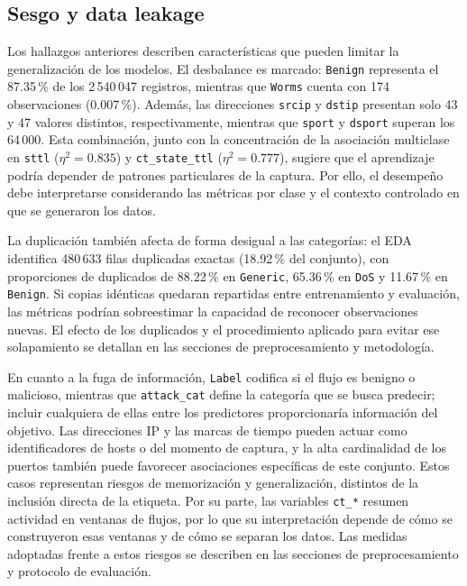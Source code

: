 \documentclass[conference]{IEEEtran}
\begin{document}
\subsection{Sesgo y data leakage}

Los hallazgos anteriores describen características que pueden limitar la generalización de los modelos. El desbalance es marcado: \texttt{Benign} representa el 87.35\,\% de los 2\,540\,047 registros, mientras que \texttt{Worms} cuenta con 174 observaciones (0.007\,\%). Además, las direcciones \texttt{srcip} y \texttt{dstip} presentan solo 43 y 47 valores distintos, respectivamente, mientras que \texttt{sport} y \texttt{dsport} superan los 64\,000. Esta combinación, junto con la concentración de la asociación multiclase en \texttt{sttl} ($\eta^2=0.835$) y \texttt{ct\_state\_ttl} ($\eta^2=0.777$), sugiere que el aprendizaje podría depender de patrones particulares de la captura. Por ello, el desempeño debe interpretarse considerando las métricas por clase y el contexto controlado en que se generaron los datos.

La duplicación también afecta de forma desigual a las categorías: el EDA identifica 480\,633 filas duplicadas exactas (18.92\,\% del conjunto), con proporciones de duplicados de 88.22\,\% en \texttt{Generic}, 65.36\,\% en \texttt{DoS} y 11.67\,\% en \texttt{Benign}. Si copias idénticas quedaran repartidas entre entrenamiento y evaluación, las métricas podrían sobreestimar la capacidad de reconocer observaciones nuevas. El efecto de los duplicados y el procedimiento aplicado para evitar ese solapamiento se detallan en las secciones de preprocesamiento y metodología.

En cuanto a la fuga de información, \texttt{Label} codifica si el flujo es benigno o malicioso, mientras que \texttt{attack\_cat} define la categoría que se busca predecir; incluir cualquiera de ellas entre los predictores proporcionaría información del objetivo. Las direcciones IP y las marcas de tiempo pueden actuar como identificadores de hosts o del momento de captura, y la alta cardinalidad de los puertos también puede favorecer asociaciones específicas de este conjunto. Estos casos representan riesgos de memorización y generalización, distintos de la inclusión directa de la etiqueta. Por su parte, las variables \texttt{ct\_*} resumen actividad en ventanas de flujos, por lo que su interpretación depende de cómo se construyeron esas ventanas y de cómo se separan los datos. Las medidas adoptadas frente a estos riesgos se describen en las secciones de preprocesamiento y protocolo de evaluación.
\end{document}
